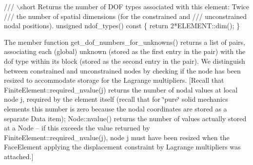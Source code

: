 \begin{DoxyCodeInclude}
 \textcolor{comment}{}
\textcolor{comment}{ /// \(\backslash\)short Returns the number of DOF types associated with this element: Twice}
\textcolor{comment}{ /// the number of spatial dimensions (for the constrained and }
\textcolor{comment}{ /// unconstrained nodal positions).}
\textcolor{comment}{} \textcolor{keywordtype}{unsigned} ndof\_types()\textcolor{keyword}{ const}
\textcolor{keyword}{  }\{
   \textcolor{keywordflow}{return} 2*ELEMENT::dim();
  \}

\end{DoxyCodeInclude}


The member function {\ttfamily get\+\_\+dof\+\_\+numbers\+\_\+for\+\_\+unknowns()} returns a list of pairs, associating each (global) unknown (stored as the first entry in the pair) with the dof type within its block (stored as the second entry in the pair). We distinguish between constrained and unconstrained nodes by checking if the node has been resized to accommodate storage for the Lagrange multipliers. \mbox{[}Recall that {\ttfamily Finite\+Element\+::required\+\_\+nvalue(j)} returns the number of nodal values at local node {\ttfamily j}, required by the element itself (recall that for \char`\"{}pure\char`\"{} solid mechanics elements this number is zero because the nodal coordinates are stored as a separate {\ttfamily Data} item); {\ttfamily Node\+::nvalue()} returns the number of values actually stored at a {\ttfamily Node} -- if this exceeds the value returned by {\ttfamily Finite\+Element\+::required\+\_\+nvalue(j)}, node {\ttfamily j} must have been resized when the {\ttfamily Face\+Element} applying the displacement constraint by Lagrange multipliers was attached.\mbox{]}


